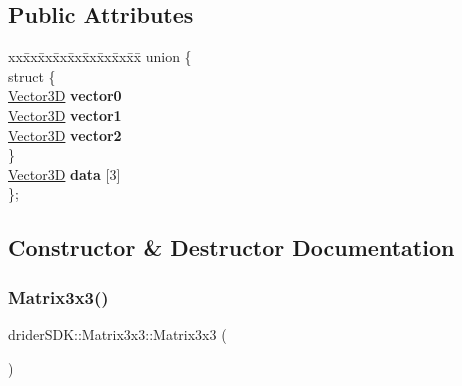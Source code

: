 \subsection*{Public Attributes}
\begin{DoxyCompactItemize}
\item 
\mbox{\label{classdrider_s_d_k_1_1_matrix3x3_a96a6d848aaeb2c08cbca173eb956b52b}} 
\begin{tabbing}
xx\=xx\=xx\=xx\=xx\=xx\=xx\=xx\=xx\=\kill
union \{\\
\mbox{\label{uniondrider_s_d_k_1_1_matrix3x3_1_1_0D0_ac0dbcbf5a4d833417f501c10f473c70d}} 
\>struct \{\\
\>\>\hyperlink{classdrider_s_d_k_1_1_vector3_d}{Vector3D} {\bfseries vector0}\\
\>\>\hyperlink{classdrider_s_d_k_1_1_vector3_d}{Vector3D} {\bfseries vector1}\\
\>\>\hyperlink{classdrider_s_d_k_1_1_vector3_d}{Vector3D} {\bfseries vector2}\\
\>\} \\
\>\hyperlink{classdrider_s_d_k_1_1_vector3_d}{Vector3D} {\bfseries data} \mbox{[}3\mbox{]}\\
\}; \\

\end{tabbing}\end{DoxyCompactItemize}


\subsection{Constructor \& Destructor Documentation}
\mbox{\label{classdrider_s_d_k_1_1_matrix3x3_af68125272dae7e0632274e8dce60fdba}} 
\subsubsection{\texorpdfstring{Matrix3x3()}{Matrix3x3()}\hspace{0.1cm}{\footnotesize\ttfamily [1/6]}}
{\footnotesize\ttfamily drider\+S\+D\+K\+::\+Matrix3x3\+::\+Matrix3x3 (\begin{DoxyParamCaption}{ }\end{DoxyParamCaption})}

